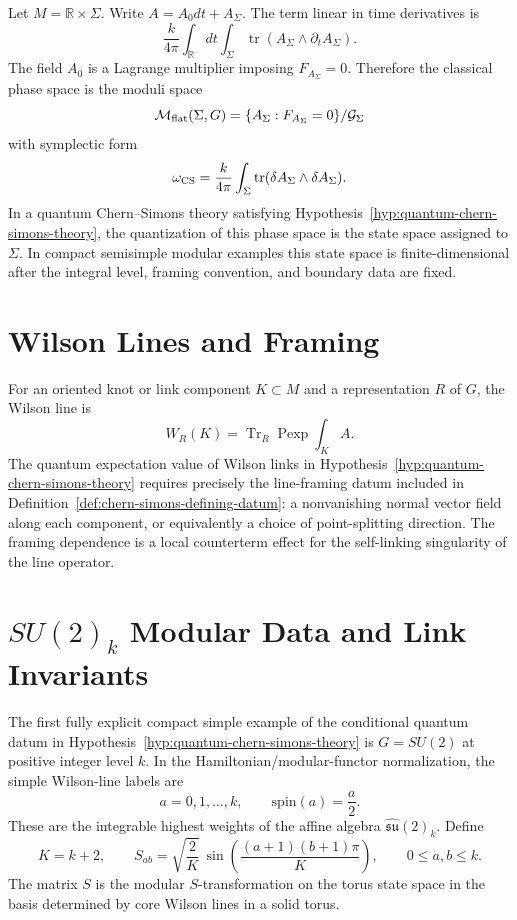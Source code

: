 Let \(M=\mathbb R\times\Sigma\).  Write \(A=A_0dt+A_\Sigma\).  The term
linear in time derivatives is
\[
  \frac{k}{4\pi}\int_{\mathbb R}dt
  \int_\Sigma \operatorname{tr}(A_\Sigma\wedge \partial_t A_\Sigma).
\]
The field \(A_0\) is a Lagrange multiplier imposing \(F_{A_\Sigma}=0\).
Therefore the classical phase space is the moduli space
\[
  \mathcal M_{\rm flat}(\Sigma,G)
  =
  \{A_\Sigma:F_{A_\Sigma}=0\}/\mathcal G_\Sigma
\]
with symplectic form
\[
  \omega_{\rm CS}
  =
  \frac{k}{4\pi}\int_\Sigma
  \operatorname{tr}(\delta A_\Sigma\wedge \delta A_\Sigma).
\]
In a quantum Chern--Simons theory satisfying
Hypothesis~\ref{hyp:quantum-chern-simons-theory}, the quantization of this
phase space is the state space assigned to \(\Sigma\).  In compact semisimple
modular examples this state space is finite-dimensional after the integral
level, framing convention, and boundary data are fixed.

\section{Wilson Lines and Framing}

For an oriented knot or link component \(K\subset M\) and a representation
\(R\) of \(G\), the Wilson line is
\[
  W_R(K)=\operatorname{Tr}_R\operatorname{Pexp}\int_K A .
\]
The quantum expectation value of Wilson links in
Hypothesis~\ref{hyp:quantum-chern-simons-theory} requires precisely the
line-framing datum included in
Definition~\ref{def:chern-simons-defining-datum}: a nonvanishing normal
vector field along each component, or equivalently a choice of point-splitting
direction.  The framing dependence is a local counterterm effect for the
self-linking singularity of the line operator.

\section{\texorpdfstring{\(SU(2)_k\)}{SU(2)k} Modular Data and Link Invariants}

The first fully explicit compact simple example of the conditional quantum
datum in Hypothesis~\ref{hyp:quantum-chern-simons-theory} is \(G=SU(2)\) at
positive integer level \(k\).  In the Hamiltonian/modular-functor
normalization, the simple Wilson-line labels are
\[
  a=0,1,\ldots,k,
  \qquad
  \text{spin}(a)=\frac a2 .
\]
These are the integrable highest weights of the affine algebra
\(\widehat{\mathfrak{su}}(2)_k\).  Define
\begin{equation}
  K=k+2,
  \qquad
  S_{ab}
  =
  \sqrt{\frac{2}{K}}\,
  \sin\!\left(\frac{(a+1)(b+1)\pi}{K}\right),
  \qquad 0\le a,b\le k .
  \label{eq:su2k-modular-s-matrix}
\end{equation}
The matrix \(S\) is the modular \(S\)-transformation on the torus state
space in the basis determined by core Wilson lines in a solid torus.

